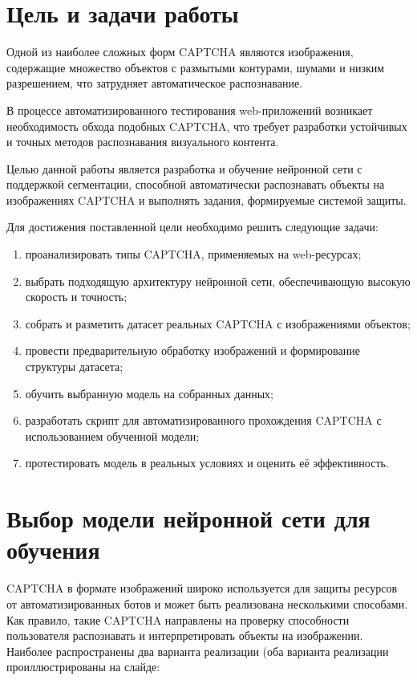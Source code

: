 \documentclass{altsu-report}
\begin{document}
\section*{Цель и задачи работы}

Одной из наиболее сложных форм CAPTCHA являются изображения, содержащие множество объектов с размытыми контурами, шумами и низким разрешением, что затрудняет автоматическое распознавание.

В процессе автоматизированного тестирования web-приложений возникает необходимость обхода подобных CAPTCHA, что требует разработки устойчивых и точных методов распознавания визуального контента.

Целью данной работы является разработка и обучение нейронной сети с поддержкой сегментации, способной автоматически распознавать объекты на изображениях CAPTCHA и выполнять задания, формируемые системой защиты.  

Для достижения поставленной цели необходимо решить следующие задачи:
\begin{enumerate}
    \item проанализировать типы CAPTCHA, применяемых на web-ресурсах;
    \item выбрать подходящую архитектуру нейронной сети, обеспечивающую высокую скорость и точность;
    \item собрать и разметить датасет реальных CAPTCHA с изображениями объектов;
    \item провести предварительную обработку изображений и формирование структуры датасета;
    \item обучить выбранную модель на собранных данных;
    \item разработать скрипт для автоматизированного прохождения CAPTCHA с использованием обученной модели;
    \item протестировать модель в реальных условиях и оценить её эффективность.
\end{enumerate}

\section*{Выбор модели нейронной сети для обучения}

CAPTCHA в формате изображений широко используется для защиты ресурсов от автоматизированных ботов и может быть реализована несколькими способами. Как правило, такие CAPTCHA направлены на проверку способности пользователя распознавать и интерпретировать объекты на изображении. Наиболее распространены два варианта реализации (оба варианта реализации проиллюстрированы на слайде:
\end{document}
